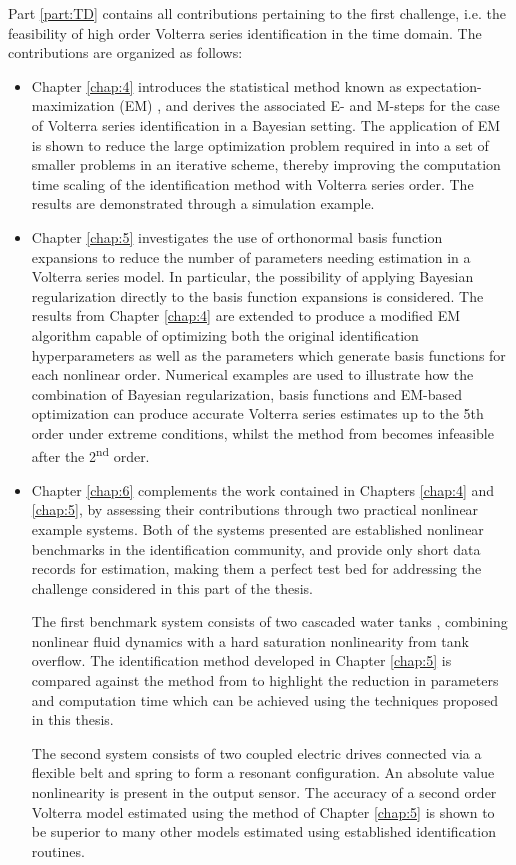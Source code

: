 Part \ref{part:TD} contains all contributions pertaining to the first challenge, i.e. the feasibility of high order Volterra series identification in the time domain. The contributions are organized as follows:
\begin{itemize}
\item Chapter \ref{chap:4} introduces the statistical method known as expectation-maximization (EM) \cite{Dempster1977}, and derives the associated E- and M-steps for the case of Volterra series identification in a Bayesian setting. The application of EM is shown to reduce the large optimization problem required in \cite{Birpoutsoukis2017} into a set of smaller problems in an iterative scheme, thereby improving the computation time scaling of the identification method with Volterra series order. The results are demonstrated through a simulation example.
\item Chapter \ref{chap:5} investigates the use of orthonormal basis function expansions to reduce the number of parameters needing estimation in a Volterra series model. In particular, the possibility of applying Bayesian regularization directly to the basis function expansions is considered. The results from Chapter \ref{chap:4} are extended to produce a modified EM algorithm capable of optimizing both the original identification hyperparameters as well as the parameters which generate basis functions for each nonlinear order. Numerical examples are used to illustrate how the combination of Bayesian regularization, basis functions and EM-based optimization can produce accurate Volterra series estimates up to the 5th order under extreme conditions, whilst the method from \cite{Birpoutsoukis2017} becomes infeasible after the 2\textsuperscript{nd} order.
\item Chapter \ref{chap:6} complements the work contained in Chapters \ref{chap:4} and \ref{chap:5}, by assessing their contributions through two practical nonlinear example systems. Both of the systems presented are established nonlinear benchmarks in the identification community, and provide only short data records for estimation, making them a perfect test bed for addressing the challenge considered in this part of the thesis. 

The first benchmark system consists of two cascaded water tanks \cite{Schoukens2016c}, combining nonlinear fluid dynamics with a hard saturation nonlinearity from tank overflow. The identification method developed in Chapter \ref{chap:5} is compared against the method from \cite{Birpoutsoukis2017} to highlight the reduction in parameters and computation time which can be achieved using the techniques proposed in this thesis.

The second system consists of two coupled electric drives \cite{Wigren2017} connected via a flexible belt and spring to form a resonant configuration. An absolute value nonlinearity is present in the output sensor. The accuracy of a second order Volterra model estimated using the method of Chapter \ref{chap:5} is shown to be superior to many other models estimated using established identification routines.
\end{itemize}

